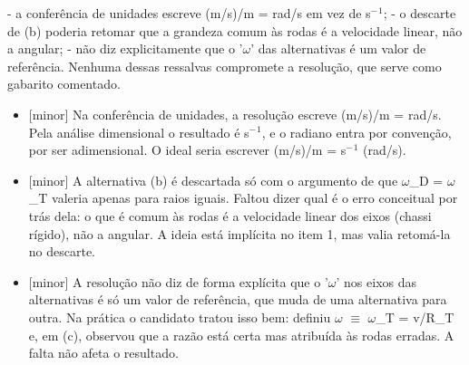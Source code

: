 \documentclass{article}%
\begin{document}
{-} a conferência de unidades escreve (m/s)/m = rad/s em vez de s$^{-}$$^{1}$;\newline%
{-} o descarte de (b) poderia retomar que a grandeza comum às rodas é a velocidade linear, não a angular;\newline%
{-} não diz explicitamente que o '$\omega$' das alternativas é um valor de referência.\newline%
\newline%
Nenhuma dessas ressalvas compromete a resolução, que serve como gabarito comentado.%
\begin{itemize}%
\item%
{[}minor{]} Na conferência de unidades, a resolução escreve (m/s)/m = rad/s. Pela análise dimensional o resultado é s$^{-}$$^{1}$, e o radiano entra por convenção, por ser adimensional. O ideal seria escrever (m/s)/m = s$^{-}$$^{1}$ (rad/s).%
\item%
{[}minor{]} A alternativa (b) é descartada só com o argumento de que $\omega$\_D = $\omega$\_T valeria apenas para raios iguais. Faltou dizer qual é o erro conceitual por trás dela: o que é comum às rodas é a velocidade linear dos eixos (chassi rígido), não a angular. A ideia está implícita no item 1, mas valia retomá{-}la no descarte.%
\item%
{[}minor{]} A resolução não diz de forma explícita que o '$\omega$' nos eixos das alternativas é só um valor de referência, que muda de uma alternativa para outra. Na prática o candidato tratou isso bem: definiu $\omega$ $\equiv$ $\omega$\_T = v/R\_T e, em (c), observou que a razão está certa mas atribuída às rodas erradas. A falta não afeta o resultado.%
\end{itemize}%
\end{document}
